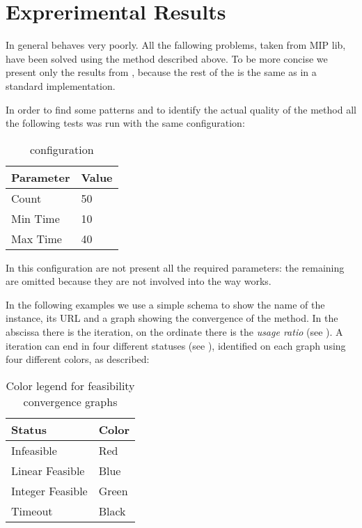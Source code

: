 \section{Exprerimental Results}

In general \fk{} behaves very poorly. All the fallowing problems, taken from MIP lib, have been solved 
using the method described above. To be more concise we  present only the results from \fk{}, because 
the rest of the \ks{} is the same as in a standard implementation. 

In order to find some patterns and to identify the actual quality of the method all the following tests was
run with the same configuration:
\begin{table}[H]
    \centering
    \begin{tabular}{|l|l|}
        \hline
        Parameter & Value \\ \hline\hline
        Count & 50 \\ \hline
        Min Time & 10 \\ \hline
        Max Time & 40 \\ \hline
    \end{tabular}
    \caption{\fk{} configuration}\label{tab:ks-config}
\end{table}

In this configuration are not present all the required parameters: the remaining are omitted because they are not 
involved into the way \fk{} works.

In the following examples we use a simple schema to show the name of the instance, its URL and a graph showing 
the convergence of the method. In the abscissa there is the \fk{} iteration, on the ordinate there is the \emph{usage ratio} (see ).
A \fk{} iteration can end in four different statuses (see ), identified on each graph using four different colors, as described:
\begin{table}[H]
    \centering
    \begin{tabular}{|l|l|}
        \hline
        Status & Color \\ \hline\hline
        Infeasible & Red \\ \hline
        Linear Feasible & Blue \\ \hline
        Integer Feasible & Green \\ \hline
        Timeout & Black \\ \hline
    \end{tabular}
    \caption{Color legend for feasibility convergence graphs}
\end{table}

